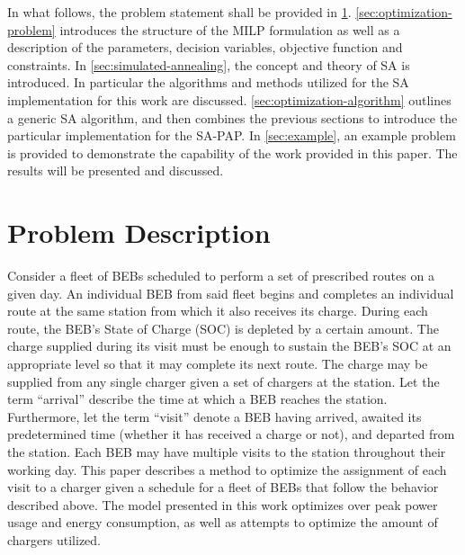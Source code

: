 \documentclass[energies,article,submit,moreauthors]{Definitions/mdpi}
\begin{document}
In what follows, the problem statement shall be provided in \ref{sec:problem-description}. \ref{sec:optimization-problem}
introduces the structure of the MILP formulation as well as a description of the parameters, decision variables,
objective function and constraints. In \ref{sec:simulated-annealing}, the concept and theory of SA is introduced. In
particular the algorithms and methods utilized for the SA implementation for this work are discussed.
\ref{sec:optimization-algorithm} outlines a generic SA algorithm, and then combines the previous sections to introduce the
particular implementation for the SA-PAP. In \ref{sec:example}, an example problem is provided to demonstrate the capability
of the work provided in this paper. The results will be presented and discussed.
\section{Problem Description}
\label{sec:problem-description}
Consider a fleet of BEBs scheduled to perform a set of prescribed routes on a given day. An individual BEB from said
fleet begins and completes an individual route at the same station from which it also receives its charge. During each
route, the BEB's State of Charge (SOC) is depleted by a certain amount. The charge supplied during its visit must be
enough to sustain the BEB's SOC at an appropriate level so that it may complete its next route. The charge may be
supplied from any single charger given a set of chargers at the station. Let the term ``arrival'' describe the time at
which a BEB reaches the station. Furthermore, let the term ``visit'' denote a BEB having arrived, awaited its
predetermined time (whether it has received a charge or not), and departed from the station. Each BEB may have multiple
visits to the station throughout their working day. This paper describes a method to optimize the assignment of each
visit to a charger given a schedule for a fleet of BEBs that follow the behavior described above. The model presented in
this work optimizes over peak power usage and energy consumption, as well as attempts to optimize the amount of chargers
utilized.
\end{document}
